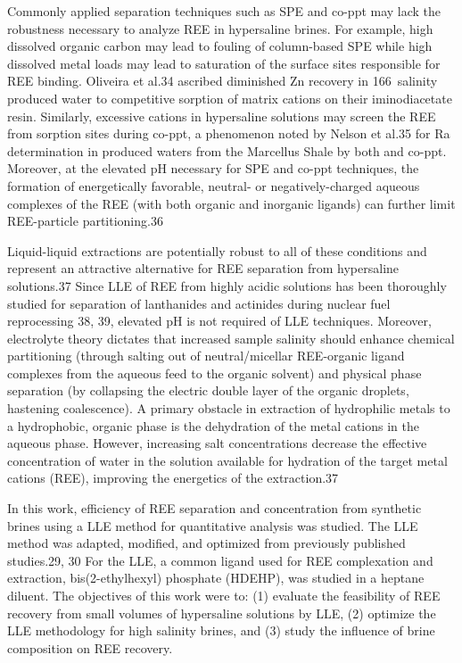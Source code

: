 Commonly applied separation techniques such as SPE and co-ppt may lack the robustness necessary to analyze REE in hypersaline brines.
For example, high dissolved organic carbon may lead to fouling of column-based SPE while high dissolved metal loads may lead to saturation of the surface sites responsible for REE binding.
Oliveira et al.34
ascribed diminished Zn recovery in 166\textperthousand\ salinity produced water to competitive sorption of matrix cations on their iminodiacetate resin.
Similarly, excessive cations in hypersaline solutions may screen the REE from sorption sites during co-ppt, a phenomenon noted by Nelson et al.35
for Ra determination in produced waters from the Marcellus Shale by both  and  co-ppt.
Moreover, at the elevated pH necessary for SPE and co-ppt techniques, the formation of energetically favorable, neutral- or negatively-charged aqueous complexes of the REE (with both organic and inorganic ligands) can further limit REE-particle partitioning.36 

Liquid-liquid extractions are potentially robust to all of these conditions and represent an attractive alternative for REE separation from hypersaline solutions.37
Since LLE of REE from highly acidic solutions has been thoroughly studied for separation of lanthanides and actinides during nuclear fuel reprocessing \citep[e.g. refs.][]{}38, 39,
elevated pH is not required of LLE techniques.
Moreover, electrolyte theory dictates that increased sample salinity should enhance chemical partitioning (through salting out of neutral/micellar REE-organic ligand complexes from the aqueous feed to the organic solvent) and physical phase separation (by collapsing the electric double layer of the organic droplets, hastening coalescence).
A primary obstacle in extraction of hydrophilic metals to a hydrophobic, organic phase is the dehydration of the metal cations in the aqueous phase.
However, increasing salt concentrations decrease the effective concentration of water in the solution available for hydration of the target metal cations (REE), improving the energetics of the extraction.37

In this work, efficiency of REE separation and concentration from synthetic brines using a LLE method for quantitative analysis was studied.
The LLE method was adapted, modified, and optimized from previously published studies.29, 30
For the LLE, a common ligand used for REE complexation and extraction, bis(2-ethylhexyl) phosphate (HDEHP), was studied in a heptane diluent.
The objectives of this work were to: (1) evaluate the feasibility of REE recovery from small volumes of hypersaline solutions by LLE, (2) optimize the LLE methodology for high salinity brines, and (3) study the influence of brine composition on REE recovery.

